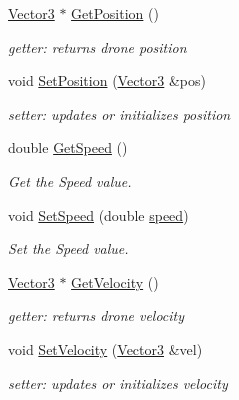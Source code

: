 \begin{DoxyCompactItemize}
\mbox{\label{classDrone_a68add193be6ffd58a10996609d2b711f}} 
\hyperlink{classVector3}{Vector3} $\ast$ \hyperlink{classDrone_a68add193be6ffd58a10996609d2b711f}{Get\+Position} ()
\begin{DoxyCompactList}\small\item\em getter\+: returns drone position \end{DoxyCompactList}\item 
\mbox{\label{classDrone_abe072bd4609dc32fe0a6bb0cfd7ce5cc}} 
void \hyperlink{classDrone_abe072bd4609dc32fe0a6bb0cfd7ce5cc}{Set\+Position} (\hyperlink{classVector3}{Vector3} \&pos)
\begin{DoxyCompactList}\small\item\em setter\+: updates or initializes position \end{DoxyCompactList}\item 
double \hyperlink{classDrone_ac8c535643f2be526c0ac8b0cc1fc49fc}{Get\+Speed} ()
\begin{DoxyCompactList}\small\item\em Get the Speed value. \end{DoxyCompactList}\item 
void \hyperlink{classDrone_af8cb12a403cf56145000f247689d0951}{Set\+Speed} (double \hyperlink{classDrone_a4cbe7d72da36c27cb58fa797240c9698}{speed})
\begin{DoxyCompactList}\small\item\em Set the Speed value. \end{DoxyCompactList}\item 
\mbox{\label{classDrone_ad0dc4a3d3a3834a9c556ca272f1362ad}} 
\hyperlink{classVector3}{Vector3} $\ast$ \hyperlink{classDrone_ad0dc4a3d3a3834a9c556ca272f1362ad}{Get\+Velocity} ()
\begin{DoxyCompactList}\small\item\em getter\+: returns drone velocity \end{DoxyCompactList}\item 
\mbox{\label{classDrone_a746a2a730a8d7a2e421ea3cfe7842732}} 
void \hyperlink{classDrone_a746a2a730a8d7a2e421ea3cfe7842732}{Set\+Velocity} (\hyperlink{classVector3}{Vector3} \&vel)
\begin{DoxyCompactList}\small\item\em setter\+: updates or initializes velocity \end{DoxyCompactList}\item 

\end{DoxyCompactItemize}
